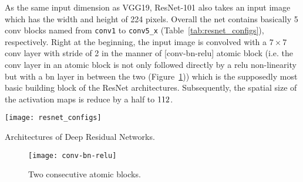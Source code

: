 As the same input dimension as VGG19, ResNet-101 also takes an input image which
has the width and height of 224 pixels. Overall the net contains basically 5
\acrshort{conv} blocks named from \texttt{conv1} to \texttt{conv5\_x}
(Table~\ref{tab:resnet_configs}), respectively. Right at the beginning, the
input image is convolved with a $7 \times 7$ \acrshort{conv} layer with stride
of 2 in the manner of [\acrshort{conv}-\acrshort{bn}-\acrshort{relu}] atomic
block (i.e. the \acrshort{conv} layer in an atomic block is not only followed
directly by a \acrshort{relu} non-linearity but with a \acrshort{bn} layer in
between the two (Figure~\ref{fig:conv-bn-relu})) which is the supposedly most
basic building block of the ResNet architectures. Subsequently, the spatial size
of the activation maps is reduce by a half to $112 \time 112$.
\begin{table}[h]
    \centering
    \texttt{[image: resnet\_configs]}
    \caption{Architectures of Deep Residual Networks.}
    \label{tab:resnet_configs}
\end{table}

\begin{figure}[h]
    \centering
    \texttt{[image: conv-bn-relu]}
    \caption{Two consecutive atomic blocks.}
    \label{fig:conv-bn-relu}
\end{figure}


